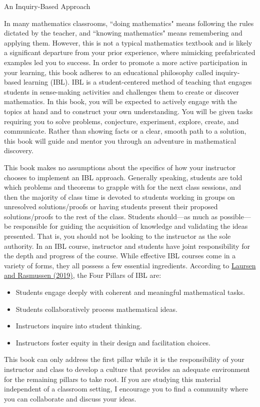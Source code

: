 \begin{section}{An Inquiry-Based Approach}

In many mathematics classrooms, ``doing mathematics" means following the rules dictated by the teacher, and ``knowing mathematics" means remembering and applying them. However, this is not a typical mathematics textbook and is likely a significant departure from your prior experience, where mimicking prefabricated examples led you to success. In order to promote a more active participation in your learning, this book adheres to an educational philosophy called inquiry-based learning (IBL). IBL is a student-centered method of teaching that engages students in sense-making activities and challenges them to create or discover mathematics.  In this book, you will be expected to actively engage with the topics at hand and to construct your own understanding.  You will be given tasks requiring you to solve problems, conjecture, experiment, explore, create, and communicate.  Rather than showing facts or a clear, smooth path to a solution, this book will guide and mentor you through an adventure in mathematical discovery. 

This book makes no assumptions about the specifics of how your instructor chooses to implement an IBL approach. Generally speaking, students are told which problems and theorems to grapple with for the next class sessions, and then the majority of class time is devoted to students working in groups on unresolved solutions/proofs or having students present their proposed solutions/proofs to the rest of the class. Students should---as much as possible---be responsible for guiding the acquisition of knowledge and validating the ideas presented. That is, you should not be looking to the instructor as the sole authority. In an IBL course, instructor and students have joint responsibility for the depth and progress of the course. While effective IBL courses come in a variety of forms, they all possess a few essential ingredients. According to \href{https://www.colorado.edu/eer/sites/default/files/attached-files/laursenrasmussencommentaryauthorversion0219.pdf}{Laursen and Rasmussen (2019)}, the Four Pillars of IBL are:
\begin{itemize}
\item Students engage deeply with coherent and meaningful mathematical tasks.
\item Students collaboratively process mathematical ideas.
\item Instructors inquire into student thinking.
\item Instructors foster equity in their design and facilitation choices.
\end{itemize}
This book can only address the first pillar while it is the responsibility of your instructor and class to develop a culture that provides an adequate environment for the remaining pillars to take root.  If you are studying this material independent of a classroom setting, I encourage you to find a community where you can collaborate and discuss your ideas.


\end{section}
